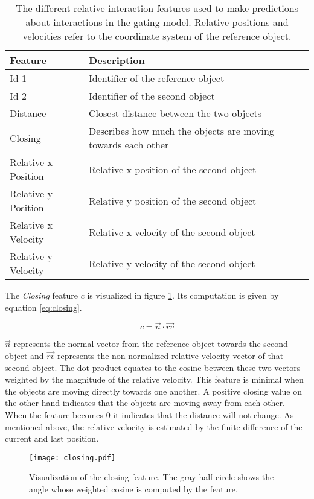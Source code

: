 \begin{table}
	\centering
	\begin{tabular*}{\textwidth}{@{\extracolsep{\fill} } l l}
		\hline \textbf{Feature} & \textbf{Description} \\ 
		\hline \hline 
		 Id 1 & Identifier of the reference object \\ 
		 Id 2 & Identifier of the second object \\ 
		 Distance & Closest distance between the two objects \\
		 Closing & Describes how much the objects are moving towards each other \\
		 Relative x Position & Relative x position of the second object \\
		 Relative y Position & Relative y position of the second object \\
		 Relative x Velocity & Relative x velocity of the second object \\
		 Relative y Velocity & Relative y velocity of the second object \\
		\hline 
	\end{tabular*} 
	\caption{The different relative interaction features used to make predictions about interactions in the gating model. Relative positions and velocities refer to the coordinate system of the reference object.}
	\label{tab:gateInteractionFeatures}
\end{table}

The \textit{Closing} feature $c$ is visualized in figure \ref{fig:closing}. Its computation is given by equation \ref{eq:closing}.

\begin{equation}
  c = \vec{n} \cdot \vec{rv}
 \label{eq:closing}
\end{equation}

$\vec{n}$ represents the normal vector from the reference object towards the second object and $\vec{rv}$ represents the non normalized relative velocity vector of that second object. The dot product equates to the cosine between these two vectors weighted by the magnitude of the relative velocity. This feature is minimal when the objects are moving directly towards one another. A positive closing value on the other hand indicates that the objects are moving away from each other. When the feature becomes 0 it indicates that the distance will not change. As mentioned above, the relative velocity is estimated by the finite difference of the current and last position.

\begin{figure}
	\centering
	\texttt{[image: closing.pdf]}
	\caption{Visualization of the closing feature. The gray half circle shows the angle whose weighted cosine is computed by the feature.} 
	\label{fig:closing}
\end{figure} 

